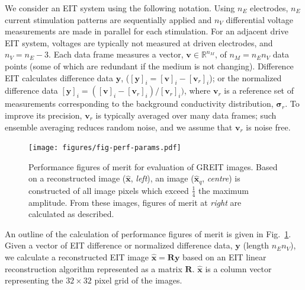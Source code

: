 \documentclass[12pt]{iopart}
\newcommand{\vB}{\mbox{$\mathbf{v}$}}
\newcommand{\xH}{\mbox{$\mathbf{\hat x}$}}
\newcommand{\yB}{\mbox{$\mathbf{y}$}}
\newcommand{\RB}{\mbox{$\mathbf{R}$}}
\newcommand{\sG}{\mbox{${\boldsymbol \sigma}$}}
\begin{document}
We consider an EIT system using the following notation.
Using $n_E$ electrodes,  $n_E$ current stimulation
patterns are sequentially applied and $n_V$ differential voltage 
measurements are made in parallel for each stimulation.
 For an adjacent drive
EIT system, voltages are typically not measured at driven
electrodes, and $n_V = n_E - 3$.  Each data frame measures
a vector, $\vB\in\mathbb{R}^{n_M}$, of $n_M= n_E n_V$ data points
(some of which are redundant if the medium is not changing).
Difference EIT calculates difference data $\yB$, ($[\yB]_i =
[\vB]_i - [\vB_r]_i$); or the normalized difference data $[\yB]_i
= ([\vB]_i - [\vB_r]_i)/[\vB_r]_i)$, where $\vB_r$ is a reference
set of measurements corresponding to the background conductivity
distribution, $\sG_r$. To improve its precision,
$\vB_r$ is typically averaged over many data frames; 
such ensemble averaging reduces random noise, and we
 assume that $\vB_r$ is noise free.



\begin{figure}[bhtp]
\begin{center}
\texttt{[image: figures/fig-perf-params.pdf]}
\caption{ \label{fig:PerfFigures}
Performance figures of merit for evaluation of GREIT images.
Based on a reconstructed image ($\xH$, {\em left}),
an image ($\xH_q$, {\em centre})
is constructed of all image pixels which exceed
 $\frac{1}{4}$ the maximum amplitude. From these images,
figures of merit at {\em right} are calculated as described.
}
\end{center}
\end{figure}

An outline of the calculation of performance figures
of merit is given in Fig.\ \ref{fig:PerfFigures}.
Given a vector of EIT difference or normalized difference
data, $\yB$ (length $n_E n_V$), we calculate a 
reconstructed EIT image $\xH = \RB \yB$ based on
an EIT linear reconstruction algorithm represented as
a matrix $\RB$. $\xH$ is a column vector representing
the $32\times 32$ pixel grid of the images.
\end{document}
